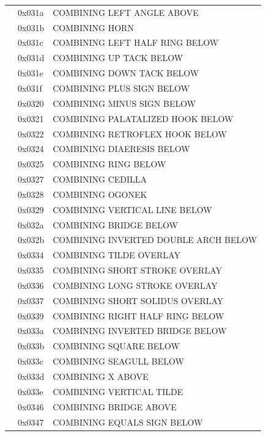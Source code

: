 \documentclass[12pt, twoside]{article}
\begin{document}
\begin{longtable}{L{1.0cm} L{2.0cm} >{\footnotesize}L{10cm}}
&0x031a&COMBINING LEFT ANGLE ABOVE\\
&0x031b&COMBINING HORN\\
&0x031c&COMBINING LEFT HALF RING BELOW\\
&0x031d&COMBINING UP TACK BELOW\\
&0x031e&COMBINING DOWN TACK BELOW\\
&0x031f&COMBINING PLUS SIGN BELOW\\
&0x0320&COMBINING MINUS SIGN BELOW\\
&0x0321&COMBINING PALATALIZED HOOK BELOW\\
&0x0322&COMBINING RETROFLEX HOOK BELOW\\
&0x0324&COMBINING DIAERESIS BELOW\\
&0x0325&COMBINING RING BELOW\\
&0x0327&COMBINING CEDILLA\\
&0x0328&COMBINING OGONEK\\
&0x0329&COMBINING VERTICAL LINE BELOW\\
&0x032a&COMBINING BRIDGE BELOW\\
&0x032b&COMBINING INVERTED DOUBLE ARCH BELOW\\
&0x0334&COMBINING TILDE OVERLAY\\
&0x0335&COMBINING SHORT STROKE OVERLAY\\
&0x0336&COMBINING LONG STROKE OVERLAY\\
&0x0337&COMBINING SHORT SOLIDUS OVERLAY\\
&0x0339&COMBINING RIGHT HALF RING BELOW\\
&0x033a&COMBINING INVERTED BRIDGE BELOW\\
&0x033b&COMBINING SQUARE BELOW\\
&0x033c&COMBINING SEAGULL BELOW\\
&0x033d&COMBINING X ABOVE\\
&0x033e&COMBINING VERTICAL TILDE\\
&0x0346&COMBINING BRIDGE ABOVE\\
&0x0347&COMBINING EQUALS SIGN BELOW\\

\end{longtable}
\end{document}
